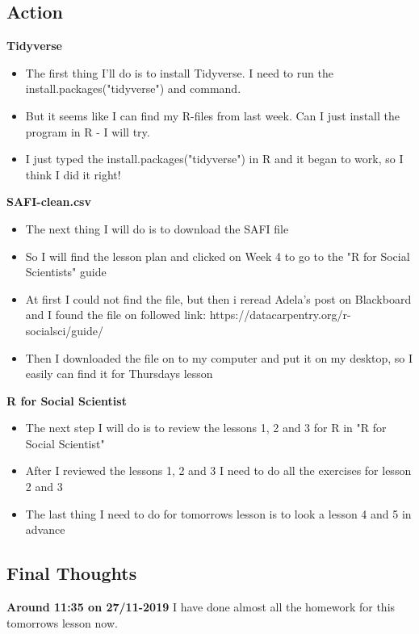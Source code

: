 \documentclass{article}
\begin{document}
\subsection{Action}
\textbf{Tidyverse}
\begin{itemize}
    \item  The first thing I'll do is to install Tidyverse. I need to run the install.packages("tidyverse") and command. 
    \item  But it seems like I can find my R-files from last week. Can I just install the program in R - I will try. 
    \item I just typed the install.packages("tidyverse") in R and it began to work, so I think I did it right! 
\end{itemize}\bigskip

\textbf{SAFI-clean.csv}
\begin{itemize}
    \item The next thing I will do is to download the SAFI file 
    \item So I will find the lesson plan and clicked on Week 4 to go to the "R for Social Scientists" guide 
    \item  At first I could not find the file, but then i reread Adela's post on Blackboard and I found the file on followed link: https://datacarpentry.org/r-socialsci/guide/ 
    \item Then I downloaded the file on to my computer and put it on my desktop, so I easily can find it for Thursdays lesson 
\end{itemize}\bigskip

\textbf{R for Social Scientist}
\begin{itemize}
    \item The next step I will do is to review the lessons 1, 2 and 3 for R in "R for Social Scientist"
    \item After I reviewed the lessons 1, 2 and 3 I need to do all the exercises for lesson 2 and 3
    \item The last thing I need to do for tomorrows lesson is to look a lesson 4 and 5 in advance  
\end{itemize}

\subsection{Final Thoughts}

\textbf{Around 11:35 on 27/11-2019 } I have done almost all the homework for this tomorrows lesson now. 
\end{document}
